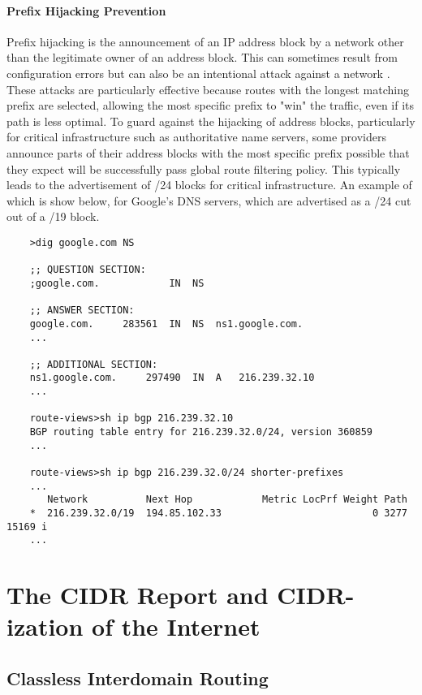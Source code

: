 \paragraph{Prefix Hijacking Prevention}

Prefix hijacking is the announcement of an IP address block by a network other than the legitimate owner of an address block. This can sometimes result from configuration errors \cite{Brown:2008hc} but can also be an intentional attack against a network \cite{Pilosov:2008ij}. These attacks are particularly effective because routes with the longest matching prefix are selected, allowing the most specific prefix to "win" the traffic, even if its path is less optimal. To guard against the hijacking of address blocks, particularly for critical infrastructure such as authoritative name servers, some providers announce parts of their address blocks with the most specific prefix possible that they expect will be successfully pass global route filtering policy. This typically leads to the advertisement of /24 blocks for critical infrastructure. An example of which is show below, for Google's DNS servers, which are advertised as a /24 cut out of a /19 block.

\begin{verbatim}
	>dig google.com NS

	;; QUESTION SECTION:
	;google.com.			IN	NS

	;; ANSWER SECTION:
	google.com.		283561	IN	NS	ns1.google.com.
	...

	;; ADDITIONAL SECTION:
	ns1.google.com.		297490	IN	A	216.239.32.10
	...

	route-views>sh ip bgp 216.239.32.10
	BGP routing table entry for 216.239.32.0/24, version 360859
	...

	route-views>sh ip bgp 216.239.32.0/24 shorter-prefixes
	...
	   Network          Next Hop            Metric LocPrf Weight Path
	*  216.239.32.0/19  194.85.102.33                          0 3277 15169 i
	...
\end{verbatim}

\section{The CIDR Report and CIDR-ization of the Internet}

\subsection{Classless Interdomain Routing}

